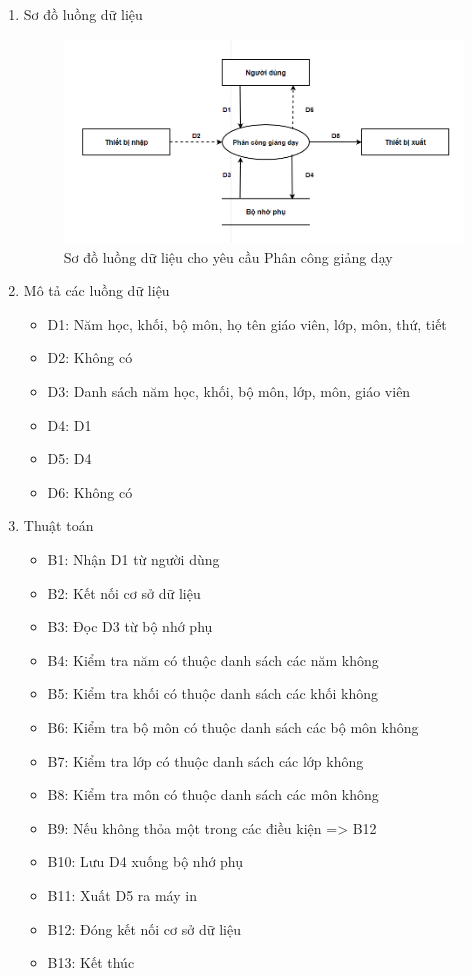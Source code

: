 \documentclass[a4paper]{article}
\begin{document}
\begin{enumerate}
\item Sơ đồ luồng dữ liệu
\begin{figure}[H] 
    \centering
    \includegraphics[width=1\textwidth]{dfd13} %
    \caption{Sơ đồ luồng dữ liệu cho yêu cầu Phân công giảng dạy}
\end{figure}
\item Mô tả các luồng dữ liệu
\begin{itemize}
\item D1: Năm học, khối, bộ môn, họ tên giáo viên, lớp, môn, thứ, tiết
\item D2: Không có
\item D3: Danh sách năm học, khối, bộ môn, lớp, môn, giáo viên
\item D4: D1
\item D5: D4
\item D6: Không có 
\end{itemize}
\item Thuật toán
\begin{itemize}
\item B1: Nhận D1 từ người dùng
\item B2: Kết nối cơ sở dữ liệu
\item B3: Đọc D3 từ bộ nhớ phụ
\item B4: Kiểm tra năm có thuộc danh sách các năm không
\item B5: Kiểm tra khối có thuộc danh sách các khối không
\item B6: Kiểm tra bộ môn có thuộc danh sách các bộ môn không
\item B7: Kiểm tra lớp có thuộc danh sách các lớp không
\item B8: Kiểm tra môn có thuộc danh sách các môn không
\item B9: Nếu không thỏa một trong các điều kiện => B12
\item B10: Lưu D4 xuống bộ nhớ phụ
\item B11: Xuất D5 ra máy in
\item B12: Đóng kết nối cơ sở dữ liệu
\item B13: Kết thúc
\end{itemize}
\end{enumerate}	
								
\end{document}
